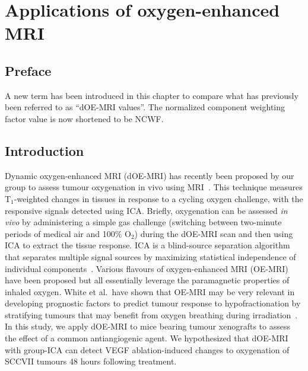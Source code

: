 
\chapter{Applications of oxygen-enhanced MRI}
\label{ch:oemri3}

\section{Preface}

A new term has been introduced in this chapter to compare what has previously been referred to as ``dOE-MRI values''.
The normalized component weighting factor value is now shortened to be \acs{NCWF}.

\section{Introduction}

Dynamic oxygen-enhanced MRI (\ac{dOE-MRI}) has recently been proposed by our group to assess tumour oxygenation in vivo using MRI~\cite{Moosvi:2018ca}. 
This technique measures T$_1$-weighted changes in tissues in response to a cycling oxygen challenge, with the responsive signals detected using \ac{ICA}. 
Briefly, oxygenation can be assessed \emph{in vivo} by administering a simple gas challenge (switching between two-minute periods of medical air and 100\% O$_2$) during the \ac{dOE-MRI} scan and then using \ac{ICA} to extract the tissue response.
\ac{ICA} is a blind-source separation algorithm that separates multiple signal sources by maximizing statistical independence of individual components~\cite{Hyvarinen:2000vk}.
Various flavours of oxygen-enhanced MRI (OE-MRI) have been proposed but all essentially leverage the paramagnetic properties of inhaled oxygen.
White et al.\ have shown that OE-MRI may be very relevant in developing prognostic factors to predict tumour response to hypofractionation by stratifying tumours that may benefit from oxygen breathing during irradiation~\cite{White:2016fz}.
In this study, we apply \ac{dOE-MRI} to mice bearing tumour xenografts to assess the effect of a common antiangiogenic agent.
We hypothesized that \ac{dOE-MRI} with group-\ac{ICA} can detect \ac{VEGF} ablation-induced changes to oxygenation of SCCVII tumours 48 hours following treatment.

